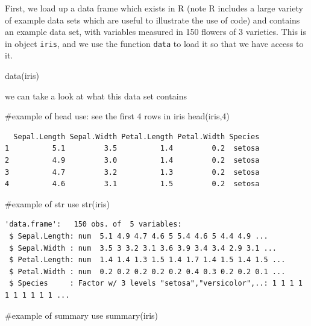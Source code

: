 \documentclass[
  letterpaper,
  DIV=11,
  numbers=noendperiod]{scrartcl}
\newenvironment{Shaded}{\begin{snugshade}}{\end{snugshade}}
\newcommand{\CommentTok}[1]{\textcolor[rgb]{0.37,0.37,0.37}{#1}}
\newcommand{\DecValTok}[1]{\textcolor[rgb]{0.68,0.00,0.00}{#1}}
\newcommand{\FunctionTok}[1]{\textcolor[rgb]{0.28,0.35,0.67}{#1}}
\newcommand{\NormalTok}[1]{\textcolor[rgb]{0.00,0.23,0.31}{#1}}
\begin{document}
First, we load up a data frame which exists in R (note R includes a
large variety of example data sets which are useful to illustrate the
use of code) and contains an example data set, with variables measured
in 150 flowers of 3 varieties. This is in object \texttt{iris}, and we
use the function \texttt{data} to load it so that we have access to it.

\begin{Shaded}
\begin{Highlighting}[]
\FunctionTok{data}\NormalTok{(iris)}
\end{Highlighting}
\end{Shaded}

we can take a look at what this data set contains

\begin{Shaded}
\begin{Highlighting}[]
\CommentTok{\#example of head use: see the first 4 rows in iris}
\FunctionTok{head}\NormalTok{(iris,}\DecValTok{4}\NormalTok{)}
\end{Highlighting}
\end{Shaded}

\begin{verbatim}
  Sepal.Length Sepal.Width Petal.Length Petal.Width Species
1          5.1         3.5          1.4         0.2  setosa
2          4.9         3.0          1.4         0.2  setosa
3          4.7         3.2          1.3         0.2  setosa
4          4.6         3.1          1.5         0.2  setosa
\end{verbatim}

\begin{Shaded}
\begin{Highlighting}[]
\CommentTok{\#example of str use}
\FunctionTok{str}\NormalTok{(iris)}
\end{Highlighting}
\end{Shaded}

\begin{verbatim}
'data.frame':   150 obs. of  5 variables:
 $ Sepal.Length: num  5.1 4.9 4.7 4.6 5 5.4 4.6 5 4.4 4.9 ...
 $ Sepal.Width : num  3.5 3 3.2 3.1 3.6 3.9 3.4 3.4 2.9 3.1 ...
 $ Petal.Length: num  1.4 1.4 1.3 1.5 1.4 1.7 1.4 1.5 1.4 1.5 ...
 $ Petal.Width : num  0.2 0.2 0.2 0.2 0.2 0.4 0.3 0.2 0.2 0.1 ...
 $ Species     : Factor w/ 3 levels "setosa","versicolor",..: 1 1 1 1 1 1 1 1 1 1 ...
\end{verbatim}

\begin{Shaded}
\begin{Highlighting}[]
\CommentTok{\#example of summary use}
\FunctionTok{summary}\NormalTok{(iris)}
\end{Highlighting}
\end{Shaded}
\end{document}

